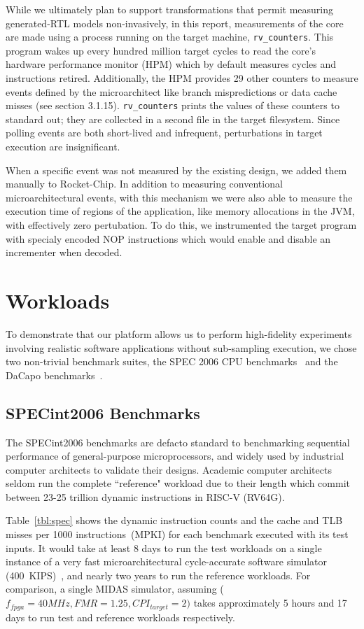 While we ultimately plan to support transformations that permit
measuring generated-RTL models non-invasively, in this report,
measurements of the core are made using a process running on the target machine,
\texttt{rv\_counters}. This program wakes up every hundred million target
cycles to read the core's hardware performance monitor (HPM) which by default measures
cycles and instructions retired. Additionally, the HPM provides 29 other counters to measure
events defined by the microarchitect like branch mispredictions or data
cache misses (see \cite{Waterman:EECS-2016-161} section 3.1.15).
\texttt{rv\_counters} prints the values of these counters to standard out; they are collected
in a second file in the target filesystem. Since polling events are both
short-lived and infrequent, perturbations in target execution are insignificant.

When a specific event was not measured by the existing design, we added them
manually to Rocket-Chip. In addition to measuring conventional
microarchitectural events, with this mechanism we were also able to measure the
execution time of regions of the application, like memory allocations in the
JVM, with effectively zero pertubation. To do this, we instrumented the target
program with specialy encoded NOP instructions which would enable and disable
an incrementer when decoded.

\section{Workloads}

To demonstrate that our platform allows us to perform high-fidelity experiments
involving realistic software applications without sub-sampling execution, we
chose two non-trivial benchmark suites, the SPEC 2006 CPU
benchmarks~\cite{spec_cpu_2006} and the DaCapo benchmarks~\cite{dacapo}.

\subsection{SPECint2006 Benchmarks} The SPECint2006 benchmarks are defacto
standard to benchmarking sequential performance of general-purpose
microprocessors, and widely used by industrial computer architects to validate
their designs. Academic computer architects seldom run the complete
``reference" workload due to their length which commit between 23-25 trillion
dynamic instructions in RISC-V (RV64G).

Table~\ref{tbl:spec} shows the dynamic instruction counts and the cache and TLB
misses per 1000 instructions~(MPKI) for each benchmark executed with its test
inputs. It would take at least 8 days to run the test workloads on a single
instance of a very fast microarchitectural cycle-accurate software simulator
(400~KIPS)~\cite{marssx86}, and nearly two years to run the reference
workloads. For comparison, a single MIDAS simulator, assuming ($f_{fpga} = 40
MHz, FMR = 1.25, CPI_{target} = 2)$ takes approximately 5 hours and 17 days to
run test and reference workloads respectively.

